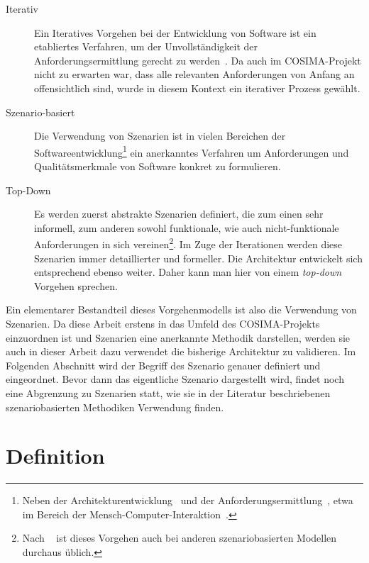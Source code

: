  \begin{description}
    \item[Iterativ] Ein Iteratives Vorgehen bei der Entwicklung von Software ist ein etabliertes Verfahren, um der Unvollständigkeit der Anforderungsermittlung gerecht zu werden~\citep{brooks1987nsb,basili2005iea,boehm1986sm,kruchten2003rup}. Da auch im COSIMA-Projekt nicht zu erwarten war, dass alle relevanten Anforderungen von Anfang an offensichtlich sind, wurde in diesem Kontext ein iterativer Prozess gewählt.
    \item[Szenario-basiert] Die Verwendung von Szenarien ist in vielen Bereichen der Softwareentwicklung\footnote{Neben der Architekturentwicklung~\citep{software_architecture_in_practice,scenario_based_software_architecture_evaluation_methods} und der Anforderungsermittlung~\citep{weidenhaupt1998sus}, etwa im Bereich der Mensch-Computer-Interaktion~\citep{five_reasons_for_scenario_based_design}.} ein anerkanntes Verfahren um Anforderungen und Qualitätsmerkmale von Software konkret zu formulieren.
    \item[Top-Down] Es werden zuerst abstrakte Szenarien definiert, die zum einen sehr informell, zum anderen sowohl funktionale, wie auch nicht-funktionale Anforderungen in sich vereinen\footnote{Nach ~\citep[S. 42f]{weidenhaupt1998ssd} ist dieses Vorgehen auch bei anderen szenariobasierten Modellen durchaus üblich.}. Im Zuge der Iterationen werden diese Szenarien immer detaillierter und formeller. Die Architektur entwickelt sich entsprechend ebenso weiter. Daher kann man hier von einem \emph{top-down} Vorgehen sprechen.
  \end{description}
  
  Ein elementarer Bestandteil dieses Vorgehenmodells ist also die Verwendung von Szenarien. Da diese Arbeit erstens in das Umfeld des COSIMA-Projekts einzuordnen ist und Szenarien eine anerkannte Methodik darstellen, werden sie auch in dieser Arbeit dazu verwendet die bisherige Architektur zu validieren. Im Folgenden Abschnitt wird der Begriff des Szenario genauer definiert und eingeordnet. Bevor dann das eigentliche Szenario dargestellt wird, findet noch eine Abgrenzung zu Szenarien statt, wie sie in der Literatur beschriebenen szenariobasierten Methodiken Verwendung finden.
  
\section{Definition} %
\label{sec:definition_szenario}

